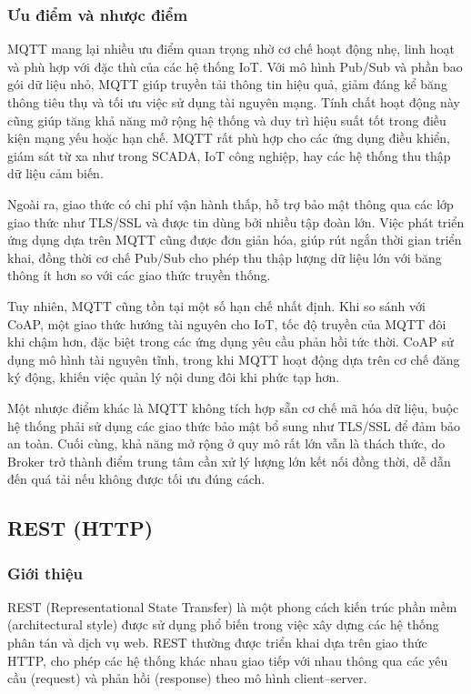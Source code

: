 \subsubsection{Ưu điểm và nhược điểm}
MQTT mang lại nhiều ưu điểm quan trọng nhờ cơ chế hoạt động nhẹ, linh hoạt và phù hợp với đặc thù của các hệ thống IoT. Với mô hình Pub/Sub và phần bao gói dữ liệu nhỏ, MQTT giúp truyền tải thông tin hiệu quả, giảm đáng kể băng thông tiêu thụ và tối ưu việc sử dụng tài nguyên mạng. Tính chất hoạt động này cũng giúp tăng khả năng mở rộng hệ thống và duy trì hiệu suất tốt trong điều kiện mạng yếu hoặc hạn chế. MQTT rất phù hợp cho các ứng dụng điều khiển, giám sát từ xa như trong SCADA, IoT công nghiệp, hay các hệ thống thu thập dữ liệu cảm biến. 

Ngoài ra, giao thức có chi phí vận hành thấp, hỗ trợ bảo mật thông qua các lớp giao thức như TLS/SSL và được tin dùng bởi nhiều tập đoàn lớn. Việc phát triển ứng dụng dựa trên MQTT cũng được đơn giản hóa, giúp rút ngắn thời gian triển khai, đồng thời cơ chế Pub/Sub cho phép thu thập lượng dữ liệu lớn với băng thông ít hơn so với các giao thức truyền thống.

Tuy nhiên, MQTT cũng tồn tại một số hạn chế nhất định. Khi so sánh với CoAP, một giao thức hướng tài nguyên cho IoT, tốc độ truyền của MQTT đôi khi chậm hơn, đặc biệt trong các ứng dụng yêu cầu phản hồi tức thời. CoAP sử dụng mô hình tài nguyên tĩnh, trong khi MQTT hoạt động dựa trên cơ chế đăng ký động, khiến việc quản lý nội dung đôi khi phức tạp hơn. 

Một nhược điểm khác là MQTT không tích hợp sẵn cơ chế mã hóa dữ liệu, buộc hệ thống phải sử dụng các giao thức bảo mật bổ sung như TLS/SSL để đảm bảo an toàn. Cuối cùng, khả năng mở rộng ở quy mô rất lớn vẫn là thách thức, do Broker trở thành điểm trung tâm cần xử lý lượng lớn kết nối đồng thời, dễ dẫn đến quá tải nếu không được tối ưu đúng cách.


\subsection{REST (HTTP)}

\subsubsection{Giới thiệu}
REST (Representational State Transfer) là một phong cách kiến trúc phần mềm
(architectural style) được sử dụng phổ biến trong việc xây dựng các hệ thống
phân tán và dịch vụ web. REST thường được triển khai dựa trên giao thức HTTP,
cho phép các hệ thống khác nhau giao tiếp với nhau thông qua các yêu cầu
(request) và phản hồi (response) theo mô hình client–server.

